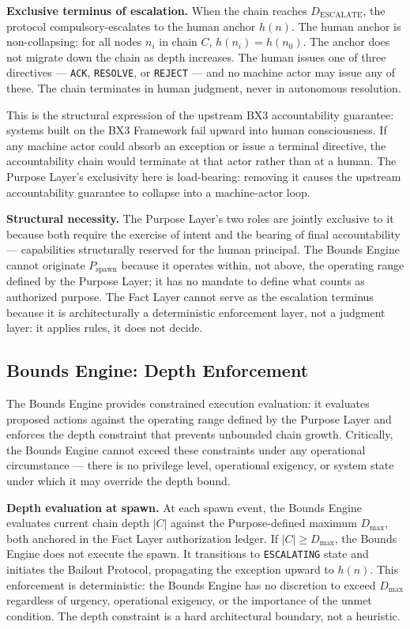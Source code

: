 \medskip
\noindent\textbf{Exclusive terminus of escalation.} When the chain reaches $D_{\mathrm{ESCALATE}}$, the protocol compulsory-escalates to the human anchor $h(n)$. The human anchor is non-collapsing: for all nodes $n_i$ in chain $C$, $h(n_i) = h(n_0)$. The anchor does not migrate down the chain as depth increases. The human issues one of three directives — \texttt{ACK}, \texttt{RESOLVE}, or \texttt{REJECT} — and no machine actor may issue any of these. The chain terminates in human judgment, never in autonomous resolution.

This is the structural expression of the upstream BX3 accountability guarantee: systems built on the BX3 Framework fail upward into human consciousness. If any machine actor could absorb an exception or issue a terminal directive, the accountability chain would terminate at that actor rather than at a human. The Purpose Layer's exclusivity here is load-bearing: removing it causes the upstream accountability guarantee to collapse into a machine-actor loop.

\medskip
\noindent\textbf{Structural necessity.} The Purpose Layer's two roles are jointly exclusive to it because both require the exercise of intent and the bearing of final accountability — capabilities structurally reserved for the human principal. The Bounds Engine cannot originate $P_{\mathrm{spawn}}$ because it operates within, not above, the operating range defined by the Purpose Layer; it has no mandate to define what counts as authorized purpose. The Fact Layer cannot serve as the escalation terminus because it is architecturally a deterministic enforcement layer, not a judgment layer: it applies rules, it does not decide.

\subsection{Bounds Engine: Depth Enforcement}
\label{sec:rs-bounds-depth}

The Bounds Engine provides constrained execution evaluation: it evaluates proposed actions against the operating range defined by the Purpose Layer and enforces the depth constraint that prevents unbounded chain growth. Critically, the Bounds Engine cannot exceed these constraints under any operational circumstance — there is no privilege level, operational exigency, or system state under which it may override the depth bound.

\medskip
\noindent\textbf{Depth evaluation at spawn.} At each spawn event, the Bounds Engine evaluates current chain depth $|C|$ against the Purpose-defined maximum $D_{\mathrm{max}}$, both anchored in the Fact Layer authorization ledger. If $|C| \geq D_{\mathrm{max}}$, the Bounds Engine does not execute the spawn. It transitions to \texttt{ESCALATING} state and initiates the Bailout Protocol, propagating the exception upward to $h(n)$. This enforcement is deterministic: the Bounds Engine has no discretion to exceed $D_{\mathrm{max}}$ regardless of urgency, operational exigency, or the importance of the unmet condition. The depth constraint is a hard architectural boundary, not a heuristic.

